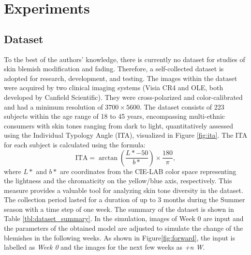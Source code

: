 
\chapter{Experiments}
\begin{spacing}{1.5}
\setlength{\parskip}{0.3in}
\section{Dataset}
To the best of the authors' knowledge, there is currently no dataset for studies of skin blemish modification and fading. Therefore, a self-collected dataset is adopted for research, development, and testing. The images within the dataset were acquired by two clinical imaging systems (Visia CR4 and OLE, both developed by Canfield Scientific). They were cross-polarized and color-calibrated and had a minimum resolution of $3700 \times 5600$. The dataset consists of 223 subjects within the age range of 18 to 45 years, encompassing multi-ethnic consumers with skin tones ranging from dark to light, quantitatively assessed using the Individual Typology Angle (ITA), visualized in Figure \ref{fig:ita}. The ITA for each subject is calculated using the formula:
\begin{equation}
\text{ITA} = \arctan\left(\frac{L* - 50}{b*}\right) \times \frac{180}{\pi},
\end{equation}
where $L*$ and $b*$ are coordinates from the CIE-LAB color space representing the lightness and the chromaticity on the yellow/blue axis, respectively. This measure provides a valuable tool for analyzing skin tone diversity in the dataset. The collection period lasted for a duration of up to 3 months during the Summer season with a time step of one week. The summary of the dataset is shown in Table \ref{tbl:dataset_summary}. In the simulation, images of Week 0 are input and the parameters of the obtained model are adjusted to simulate the change of the blemishes in the following weeks. As shown in Figure\ref{fig:forward}, the input is labelled as \textit{Week 0} and the images for the next few weeks as \textit{+n W}.


\end{spacing}
